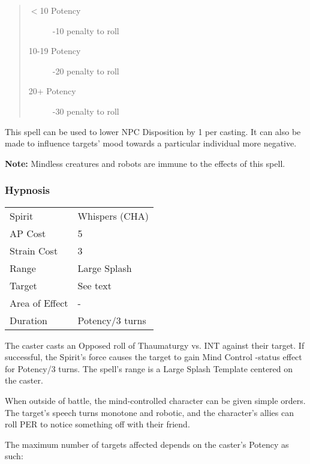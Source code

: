 \documentclass[11pt,a4paper,twocolumn]{book}
\begin{document}
\begin{quote}
	\begin{description}
		\item[$<$10 Potency] 	-10 penalty to roll
		\item[10-19 Potency] 	-20 penalty to roll
		\item[20+ Potency] 	-30 penalty to roll
	\end{description}
\end{quote}

This spell can be used to lower NPC Disposition by 1 per casting. It can also be made to influence targets' mood towards a particular individual more negative.

\textbf{Note:} Mindless creatures and robots are immune to the effects of this spell.


\subsubsection*{Hypnosis}
{
	\begin{tabu} to 75mm{| X[l,4] | X[l,7] |}
		\hline
		Spirit         & Whispers (CHA)  \\
		AP Cost        & 5               \\
		Strain Cost    & 3               \\
		Range          & Large Splash    \\
		Target         & See text        \\
		Area of Effect & -               \\
		Duration       & Potency/3 turns \\ \hline
	\end{tabu}
	
}

\medskip

The caster casts an Opposed roll of Thaumaturgy vs. INT against their target. If successful, the Spirit's force causes the target to gain Mind Control -status effect for Potency/3 turns. The spell's range is a Large Splash Template centered on the caster. 

When outside of battle, the mind-controlled character can be given simple orders. The target's speech turns monotone and robotic, and the character's allies can roll PER to notice something off with their friend.

The maximum number of targets affected depends on the caster's Potency as such:
\end{document}
